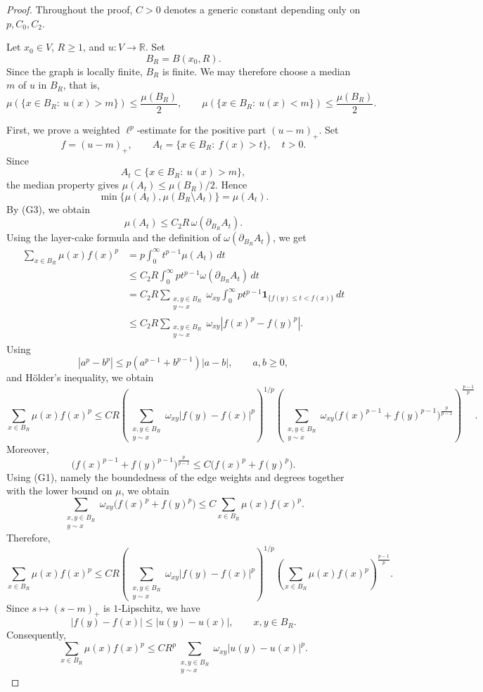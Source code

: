 \documentclass[twoside,12pt,letter]{article}
\theoremstyle{plain}
\theoremstyle{definition}
\theoremstyle{remark}
\numberwithin{equation}{section}
\begin{document}
\begin{proof}

Throughout the proof, \(C>0\) denotes a generic constant depending only on \(p,C_0,C_2\).


Let \(x_0\in V\), \(R\ge1\), and \(u:V\to\mathbb R\). Set
\[
B_R=B(x_0,R).
\]
Since the graph is locally finite, \(B_R\) is finite. We may therefore choose
a median \(m\) of \(u\) in \(B_R\), that is,
\[
\mu(\{x\in B_R:\ u(x)>m\})\le \frac{\mu(B_R)}{2},
\qquad
\mu(\{x\in B_R:\ u(x)<m\})\le \frac{\mu(B_R)}{2}.
\]

First, we  prove a weighted \(\ell^p\)-estimate for the positive part \((u-m)_+\). Set
\[
f=(u-m)_+,
\qquad
A_t=\{x\in B_R:\ f(x)>t\},\quad t>0.
\]
Since
\[
A_t\subset \{x\in B_R:\ u(x)>m\},
\]
the median property gives \(\mu(A_t)\le \mu(B_R)/2\). Hence
\[
\min\{\mu(A_t),\mu(B_R\setminus A_t)\}=\mu(A_t).
\]
By {\rm(G3)}, we obtain
\[
\mu(A_t)\le C_2R\,\omega(\partial_{B_R}A_t).
\]
Using the layer-cake formula and the definition of
\(\omega(\partial_{B_R}A_t)\), we get
\[
\begin{aligned}
\sum_{x\in B_R}\mu(x)f(x)^p
&=
p\int_0^\infty t^{p-1}\mu(A_t)\,dt \\
&\le
C_2R
\int_0^\infty p t^{p-1}\omega(\partial_{B_R}A_t)\,dt  \\
&=
C_2R
\sum_{\substack{x,y\in B_R\\ y\sim x}}
\omega_{xy}
\int_0^\infty p t^{p-1}
\mathbf 1_{\{f(y)\le t<f(x)\}}\,dt \\
&\le
C_2R
\sum_{\substack{x,y\in B_R\\ y\sim x}}
\omega_{xy}|f(x)^p-f(y)^p|.
\end{aligned}
\]
Using
\[
|a^p-b^p|
\le
p(a^{p-1}+b^{p-1})|a-b|,
\qquad a,b\ge0,
\]
and H\"older's inequality, we obtain
\[
\sum_{x\in B_R}\mu(x)f(x)^p
\le
C R
\left(
\sum_{\substack{x,y\in B_R\\ y\sim x}}
\omega_{xy}|f(y)-f(x)|^p
\right)^{1/p} 
\left(
\sum_{\substack{x,y\in B_R\\ y\sim x}}
\omega_{xy}
\bigl(f(x)^{p-1}+f(y)^{p-1}\bigr)^{\frac{p}{p-1}}
\right)^{\frac{p-1}{p}}.
\]
Moreover,
\[
\bigl(f(x)^{p-1}+f(y)^{p-1}\bigr)^{\frac{p}{p-1}}
\le
C\bigl(f(x)^p+f(y)^p\bigr).
\]
Using {\rm(G1)}, namely the boundedness of the edge weights and degrees
together with the lower bound on \(\mu\), we obtain
\[
\sum_{\substack{x,y\in B_R\\ y\sim x}}
\omega_{xy}\bigl(f(x)^p+f(y)^p\bigr)
\le
C
\sum_{x\in B_R}\mu(x)f(x)^p.
\]
Therefore,
\[
\sum_{x\in B_R}\mu(x)f(x)^p
\le
C R
\left(
\sum_{\substack{x,y\in B_R\\ y\sim x}}
\omega_{xy}|f(y)-f(x)|^p
\right)^{1/p}
\left(
\sum_{x\in B_R}\mu(x)f(x)^p
\right)^{\frac{p-1}{p}}.
\]
Since \(s\mapsto (s-m)_+\) is \(1\)-Lipschitz, we have
\[
|f(y)-f(x)|\le |u(y)-u(x)|,
\qquad x,y\in B_R.
\]
Consequently,
\begin{equation}\label{chang1}
\sum_{x\in B_R}\mu(x)f(x)^p
\le
C R^p
\sum_{\substack{x,y\in B_R\\ y\sim x}}
\omega_{xy}|u(y)-u(x)|^p.
\end{equation}


\end{proof}
\end{document}
